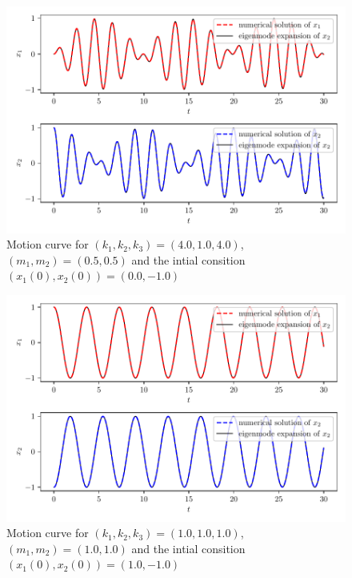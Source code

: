 
        \begin{figure}[H]
            \centering
            \includegraphics[width=0.9\linewidth]{../Numerical-Calculation/img/(k1,k2,k3)=(4.0,1.0,4.0),(m1,m2)=(0.5,0.5),(x1_i,x1_2)=(0.0,1.0).pdf}
            \caption{Motion curve for $\left(k_1,k_2,k_3\right)=\left(4.0,1.0,4.0\right)$, $\left(m_1,m_2\right)=\left(0.5,0.5\right)$ and the intial consition $\left(x_{1}(0),x_2(0)\right)=\left(0.0,-1.0\right)$}
        \end{figure}

        \begin{figure}[H]
            \centering
            \includegraphics[width=0.9\linewidth]{../Numerical-Calculation/img/(k1,k2,k3)=(1.0,1.0,1.0),(m1,m2)=(1.0,1.0),(x1_i,x1_2)=(1.0,-1.0).pdf}
            \caption{Motion curve for $\left(k_1,k_2,k_3\right)=\left(1.0,1.0,1.0\right)$, $\left(m_1,m_2\right)=\left(1.0,1.0\right)$ and the intial consition $\left(x_{1}(0),x_2(0)\right)=\left(1.0,-1.0\right)$}
        \end{figure}

